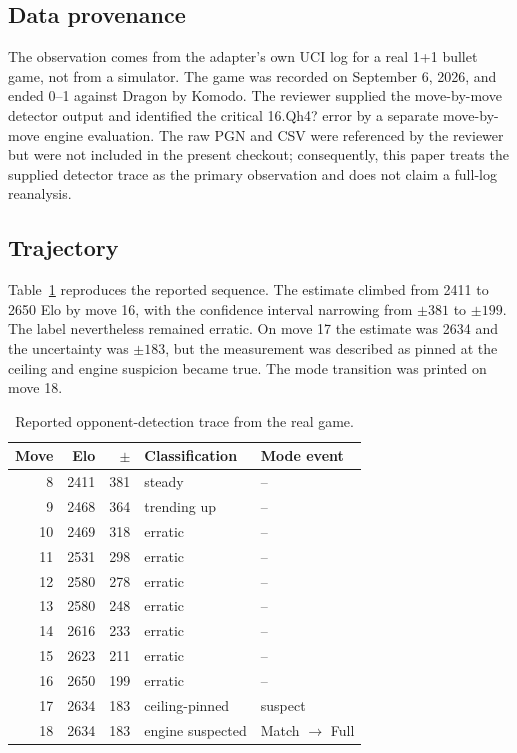 \documentclass[conference]{IEEEtran}
\begin{document}
\subsection{Data provenance}
The observation comes from the adapter's own UCI log for a real 1+1 bullet game, not from a simulator. The game was recorded on September 6, 2026, and ended 0--1 against Dragon by Komodo. The reviewer supplied the move-by-move detector output and identified the critical 16.Qh4? error by a separate move-by-move engine evaluation. The raw PGN and CSV were referenced by the reviewer but were not included in the present checkout; consequently, this paper treats the supplied detector trace as the primary observation and does not claim a full-log reanalysis.

\subsection{Trajectory}
Table~\ref{tab:trajectory} reproduces the reported sequence. The estimate climbed from 2411 to 2650 Elo by move 16, with the confidence interval narrowing from $\pm381$ to $\pm199$. The label nevertheless remained erratic. On move 17 the estimate was 2634 and the uncertainty was $\pm183$, but the measurement was described as pinned at the ceiling and engine suspicion became true. The mode transition was printed on move 18.

\begin{table}[t]
\caption{Reported opponent-detection trace from the real game.}
\label{tab:trajectory}
\centering
\scriptsize
\begin{tabular}{@{}r r r l l@{}}
\toprule
Move & Elo & $\pm$ & Classification & Mode event \\
\midrule
8  & 2411 & 381 & steady & -- \\
9  & 2468 & 364 & trending up & -- \\
10 & 2469 & 318 & erratic & -- \\
11 & 2531 & 298 & erratic & -- \\
12 & 2580 & 278 & erratic & -- \\
13 & 2580 & 248 & erratic & -- \\
14 & 2616 & 233 & erratic & -- \\
15 & 2623 & 211 & erratic & -- \\
16 & 2650 & 199 & erratic & -- \\
17 & 2634 & 183 & ceiling-pinned & suspect \\
18 & 2634 & 183 & engine suspected & Match $\rightarrow$ Full \\
\bottomrule
\end{tabular}
\end{table}
\end{document}
